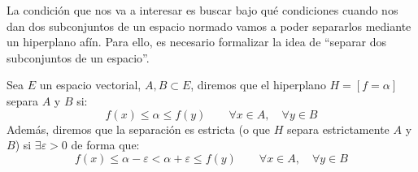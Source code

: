 \noindent
La condición que nos va a interesar es buscar bajo qué condiciones cuando nos dan dos subconjuntos de un espacio normado vamos a poder separarlos mediante un hiperplano afín. Para ello, es necesario formalizar la idea de ``separar dos subconjuntos de un espacio''.

\begin{definicion}
    Sea $E$ un espacio vectorial, $A,B\subset E$, diremos que el hiperplano $H=[f=\alpha]$ separa $A$ y $B$ si:
    \begin{equation*}
        f(x) \leq \alpha \leq f(y) \qquad \forall x\in A,\quad  \forall y\in B
    \end{equation*}
    Además, diremos que la separación es estricta (o que $H$ separa estrictamente $A$ y $B$) si $\exists \varepsilon>0$ de forma que:
    \begin{equation*}
        f(x) \leq \alpha - \varepsilon < \alpha+\varepsilon \leq f(y) \qquad \forall x\in A, \quad  \forall y\in B
    \end{equation*}
\end{definicion}

